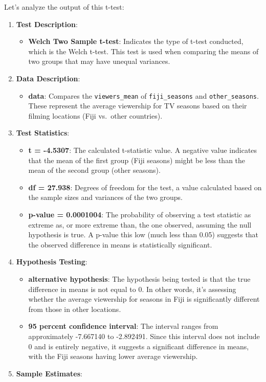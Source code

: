 \documentclass[
]{book}
\providecommand{\tightlist}{%
  \setlength{\itemsep}{0pt}\setlength{\parskip}{0pt}}
\begin{document}
Let's analyze the output of this t-test:

\begin{enumerate}
\def\labelenumi{\arabic{enumi}.}
\tightlist
\item
  \textbf{Test Description}:

  \begin{itemize}
  \tightlist
  \item
    \textbf{Welch Two Sample t-test}: Indicates the type of t-test conducted, which is the Welch t-test. This test is used when comparing the means of two groups that may have unequal variances.
  \end{itemize}
\item
  \textbf{Data Description}:

  \begin{itemize}
  \tightlist
  \item
    \textbf{data}: Compares the \texttt{viewers\_mean} of \texttt{fiji\_seasons} and \texttt{other\_seasons}. These represent the average viewership for TV seasons based on their filming locations (Fiji vs.~other countries).
  \end{itemize}
\item
  \textbf{Test Statistics}:

  \begin{itemize}
  \tightlist
  \item
    \textbf{t = -4.5307}: The calculated t-statistic value. A negative value indicates that the mean of the first group (Fiji seasons) might be less than the mean of the second group (other seasons).
  \item
    \textbf{df = 27.938}: Degrees of freedom for the test, a value calculated based on the sample sizes and variances of the two groups.
  \item
    \textbf{p-value = 0.0001004}: The probability of observing a test statistic as extreme as, or more extreme than, the one observed, assuming the null hypothesis is true. A p-value this low (much less than 0.05) suggests that the observed difference in means is statistically significant.
  \end{itemize}
\item
  \textbf{Hypothesis Testing}:

  \begin{itemize}
  \tightlist
  \item
    \textbf{alternative hypothesis}: The hypothesis being tested is that the true difference in means is not equal to 0. In other words, it's assessing whether the average viewership for seasons in Fiji is significantly different from those in other locations.
  \item
    \textbf{95 percent confidence interval}: The interval ranges from approximately -7.667140 to -2.892491. Since this interval does not include 0 and is entirely negative, it suggests a significant difference in means, with the Fiji seasons having lower average viewership.
  \end{itemize}
\item
  \textbf{Sample Estimates}:


\end{enumerate}
\end{document}
